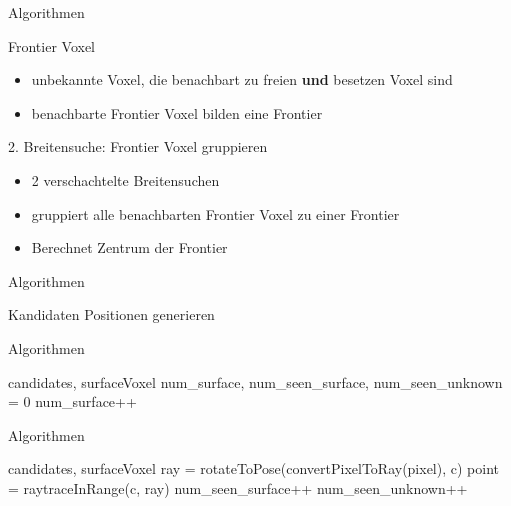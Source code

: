 \documentclass{beamer}
\begin{document}
\begin{frame}{Algorithmen}
	\begin{exampleblock}{Frontier Voxel}
		\begin{itemize}
			\item unbekannte Voxel, die benachbart zu freien \textbf{und} besetzen Voxel sind
			\item benachbarte Frontier Voxel bilden eine Frontier
		\end{itemize}
	\end{exampleblock}
	\begin{block}{2. Breitensuche: Frontier Voxel gruppieren}
		\begin{itemize}
			\item 2 verschachtelte Breitensuchen
			\item gruppiert alle benachbarten Frontier Voxel zu einer Frontier
			\item Berechnet Zentrum der Frontier
		\end{itemize}
	\end{block}
\end{frame}

\begin{frame}{Algorithmen}
	\begin{block}{Kandidaten Positionen generieren}

	\end{block}

\end{frame}

\begin{frame}{Algorithmen}
	\begin{algorithm}[H]
		\caption{Evaluate Candidates Part 1}
		\begin{algorithmic}[2]
			\Require candidates, surfaceVoxel
			\State num\_surface, num\_seen\_surface, num\_seen\_unknown = 0
			\State num\_surface++
			\EndIf
			\EndFor
			\EndFor

		\end{algorithmic}
	\end{algorithm}

\end{frame}

\begin{frame}{Algorithmen}
	\begin{algorithm}[H]
		\caption{Evaluate Candidates Part 2}
		\begin{algorithmic}[2]
			\Require candidates, surfaceVoxel
			\State ray = rotateToPose(convertPixelToRay(pixel), c)
			\State point = {\color{blue}raytraceInRange(c, ray)}
			\State num\_seen\_surface++
			\EndIf
			\State num\_seen\_unknown++
			\EndIf
			\EndFor
			\EndFor

		\end{algorithmic}
	\end{algorithm}

\end{frame}
\end{document}
